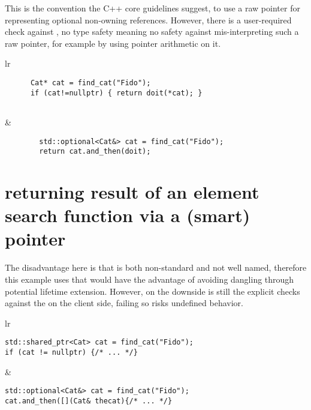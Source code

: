 \documentclass[a4paper,10pt,oneside,openany,final,article]{memoir}
\begin{document}
This is the convention the C++ core guidelines suggest, to use a raw pointer for representing optional non-owning references.
However, there is a user-required check against , no type safety meaning no safety against mis-interpreting such a raw pointer, for example by using pointer arithmetic on it.

\begin{tabular}{ lr }
  \begin{minipage}[t]{0.45\columnwidth}
    \begin{verbatim}
      Cat* cat = find_cat("Fido");
      if (cat!=nullptr) { return doit(*cat); }


    \end{verbatim}
  \end{minipage}
  &
    \begin{minipage}[t]{0.45\columnwidth}
      \begin{verbatim}
        std::optional<Cat&> cat = find_cat("Fido");
        return cat.and_then(doit);

      \end{verbatim}
    \end{minipage}
\end{tabular}

\section{returning result of an element search function via a (smart) pointer}

The disadvantage here is that  is both non-standard and not well named, therefore this example uses  that would have the advantage of avoiding dangling through potential lifetime extension.
However, on the downside is still the explicit checks against the  on the client side, failing so risks undefined behavior.

  \begin{tabular}{ lr }
  \begin{minipage}[t]{0.45\columnwidth}
    \begin{verbatim}
std::shared_ptr<Cat> cat = find_cat("Fido");
if (cat != nullptr) {/* ... */}

    \end{verbatim}
  \end{minipage}
  &
    \begin{minipage}[t]{0.45\columnwidth}
      \begin{verbatim}
std::optional<Cat&> cat = find_cat("Fido");
cat.and_then([](Cat& thecat){/* ... */}

      \end{verbatim}
    \end{minipage}
  \end{tabular}
\end{document}
